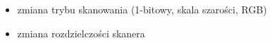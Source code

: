\documentclass[a4paper,12pt]{extarticle}  %
\begin{document}
\begin{enumerate}
\begin{itemize}
		      \item zmiana trybu skanowania (1-bitowy, skala szarości, RGB)
		            \begin{figure}[H]
			            \centering
		            \end{figure}
		      \item zmiana rozdzielczości skanera
		            \begin{figure}[H]
			            \centering
		            \end{figure}
	      \end{itemize}


\end{enumerate}
\end{document}
